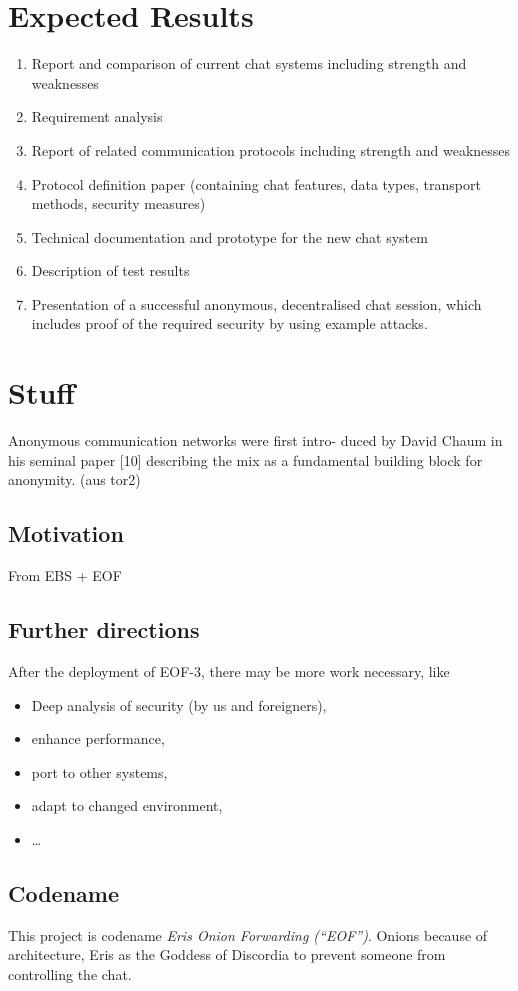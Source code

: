\section{Expected Results}
\begin{enumerate}
\item Report and comparison of current chat systems including strength and weaknesses
\item Requirement analysis
\item Report of related communication protocols including strength and weaknesses
\item Protocol definition paper (containing chat features, data types, transport methods, security measures)
\item Technical documentation and prototype for the new chat system
\item Description of test results
\item Presentation of a successful anonymous, decentralised chat session, which includes proof of the required security by using example attacks.
\end{enumerate}



\section{Stuff}

Anonymous communication networks were first intro-
duced by David Chaum in his seminal paper [10] describing
the mix as a fundamental building block for anonymity.
(aus tor2)

\subsection{Motivation}
From EBS + EOF

\subsection{Further directions}
After the deployment of EOF-3, there may be more work necessary, like
\begin{itemize}
\item Deep analysis of security (by us and foreigners),
\item enhance performance,
\item port to other systems,
\item adapt to changed environment,
\item \ldots{}
\end{itemize}

\subsection{Codename}
This project is codename \textit{Eris Onion Forwarding ("`EOF"')}.
Onions because of architecture, Eris as the Goddess of Discordia to
prevent someone from controlling the chat.
